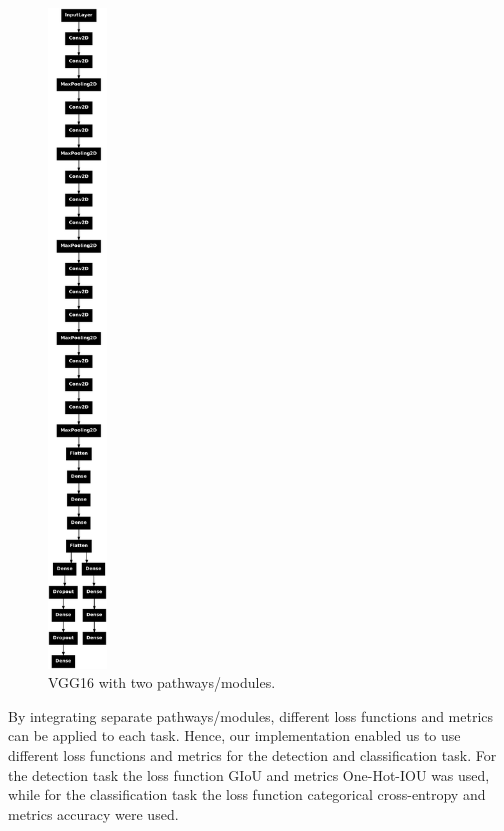 \documentclass[12pt]{article}
\begin{document}
\begin{figure}[h]
    \centering
    \includegraphics[width=0.14\textwidth]{./graphics/3.png}
    \caption{VGG16 with two pathways/modules.}
    \label{fig:VGG16architecture}
\end{figure}

By integrating separate pathways/modules, different loss functions and metrics can be applied to each task. Hence, our implementation enabled us to use different loss functions and metrics for the detection and classification task. 
For the detection task the loss function GIoU and metrics One-Hot-IOU was used, while for the classification task the loss function categorical cross-entropy and metrics accuracy were used.
\end{document}
